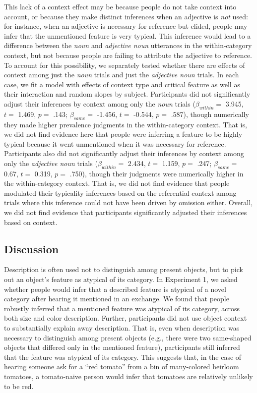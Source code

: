 \documentclass{ucetd}
\begin{document}
This lack of a context effect may be because people do not take context
into account, or because they make distinct inferences when an adjective
is \emph{not} used: for instance, when an adjective is necessary for
reference but elided, people may infer that the unmentioned feature is
very typical. This inference would lead to a difference between the
\emph{noun} and \emph{adjective noun} utterances in the within-category
context, but not because people are failing to attribute the adjective
to reference. To account for this possibility, we separately tested
whether there are effects of context among just the \emph{noun} trials
and just the \emph{adjective noun} trials. In each case, we fit a model
with effects of context type and critical feature as well as their
interaction and random slopes by subject. Participants did not
significantly adjust their inferences by context among only the
\emph{noun} trials (\(\beta_{within} =\) 3.945, \(t =\) 1.469, \(p =\)
.143; \(\beta_{same} =\) -1.456, \(t =\) -0.544, \(p =\) .587), though
numerically they made higher prevalence judgments in the within-category
context. That is, we did not find evidence here that people were
inferring a feature to be highly typical because it went unmentioned
when it was necessary for reference. Participants also did not
significantly adjust their inferences by context among only the
\emph{adjective noun} trials (\(\beta_{within} =\) 2.434, \(t =\) 1.159,
\(p =\) .247; \(\beta_{same} =\) 0.67, \(t =\) 0.319, \(p =\) .750),
though their judgments were numerically higher in the within-category
context. That is, we did not find evidence that people modulated their
typicality inferences based on the referential context among trials
where this inference could not have been driven by omission either.
Overall, we did not find evidence that participants significantly
adjusted their inferences based on context.

\hypertarget{discussion-1}{%
\subsection{Discussion}\label{discussion-1}}

Description is often used not to distinguish among present objects, but
to pick out an object's feature as atypical of its category. In
Experiment 1, we asked whether people would infer that a described
feature is atypical of a novel category after hearing it mentioned in an
exchange. We found that people robustly inferred that a mentioned
feature was atypical of its category, across both size and color
description. Further, participants did not use object context to
substantially explain away description. That is, even when description
was necessary to distinguish among present objects (e.g., there were two
same-shaped objects that differed only in the mentioned feature),
participants still inferred that the feature was atypical of its
category. This suggests that, in the case of hearing someone ask for a
``red tomato'' from a bin of many-colored heirloom tomatoes, a
tomato-naive person would infer that tomatoes are relatively unlikely to
be red.
\end{document}
